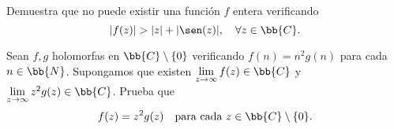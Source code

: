 \documentclass[12pt]{article}
\begin{document}
    \begin{ejercicio}[2.5 puntos]
        Demuestra que no puede existir una función $f$ entera verificando
        \[
            |f(z)| > |z| + |\sen(z)|, \quad \forall z \in \bb{C}.
        \]
    \end{ejercicio}

    \begin{ejercicio}[2.5 puntos]
        Sean $f, g$ holomorfas en $\bb{C} \setminus \{0\}$ verificando $f(n) = n^2 g(n)$ para cada $n \in \bb{N}$. Supongamos que existen $\lim\limits_{z \to \infty} f(z) \in \bb{C}$ y $\lim\limits_{z \to \infty} z^2 g(z) \in \bb{C}$. Prueba que
        \[
            f(z) = z^2 g(z) \quad \text{para cada } z \in \bb{C} \setminus \{0\}.
        \]
    \end{ejercicio}
\end{document}
